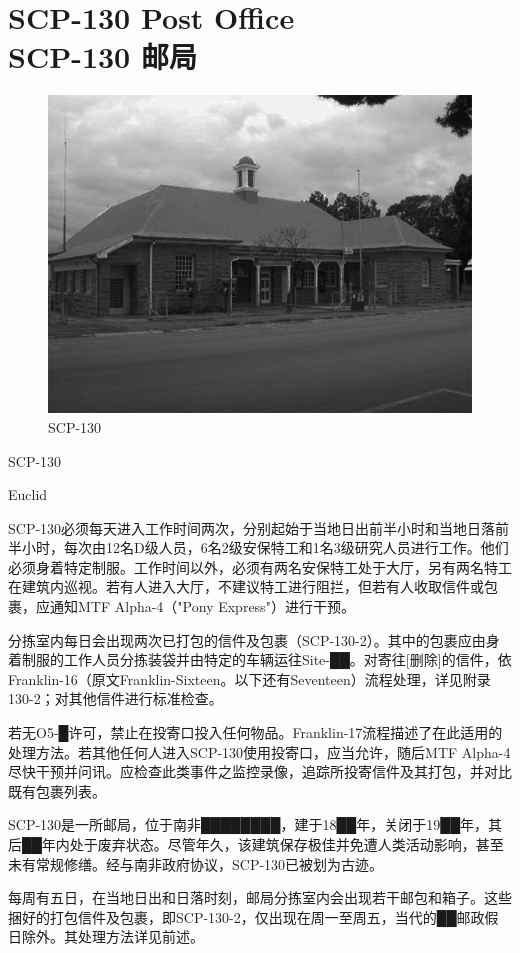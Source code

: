\chapter[SCP-130 邮局]{
    SCP-130 Post Office\\
    SCP-130 邮局
}

\label{chap:SCP-130}

\begin{figure}[H]
    \centering
    \includegraphics[width=0.5\linewidth]{images/SCP-130.jpg}
    \caption*{SCP-130}
\end{figure}

SCP-130

Euclid

SCP-130必须每天进入工作时间两次，分别起始于当地日出前半小时和当地日落前半小时，每次由12名D级人员，6名2级安保特工和1名3级研究人员进行工作。他们必须身着特定制服。工作时间以外，必须有两名安保特工处于大厅，另有两名特工在建筑内巡视。若有人进入大厅，不建议特工进行阻拦，但若有人收取信件或包裹，应通知MTF Alpha-4（"Pony Express"）进行干预。

分拣室内每日会出现两次已打包的信件及包裹（SCP-130-2）。其中的包裹应由身着制服的工作人员分拣装袋并由特定的车辆运往Site-██。对寄往{[}删除]的信件，依Franklin-16（原文Franklin-Sixteen。以下还有Seventeen）流程处理，详见附录130-2；对其他信件进行标准检查。

若无O5-█许可，禁止在投寄口投入任何物品。Franklin-17流程描述了在此适用的处理方法。若其他任何人进入SCP-130使用投寄口，应当允许，随后MTF Alpha-4尽快干预并问讯。应检查此类事件之监控录像，追踪所投寄信件及其打包，并对比既有包裹列表。

SCP-130是一所邮局，位于南非████████，建于18██年，关闭于19██年，其后██年内处于废弃状态。尽管年久，该建筑保存极佳并免遭人类活动影响，甚至未有常规修缮。经与南非政府协议，SCP-130已被划为古迹。

每周有五日，在当地日出和日落时刻，邮局分拣室内会出现若干邮包和箱子。这些捆好的打包信件及包裹，即SCP-130-2，仅出现在周一至周五，当代的██邮政假日除外。其处理方法详见前述。


